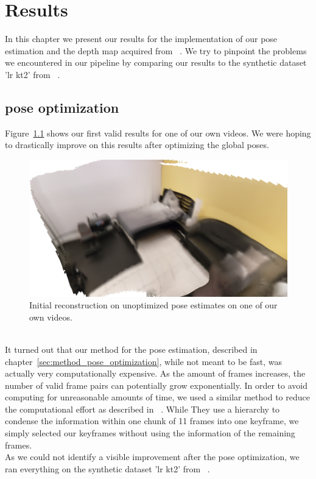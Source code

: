 \chapter{Results}
    In this chapter we present our results for the implementation of our pose estimation and the depth map acquired from ~\cite{luo2020consistent}.
    We try to pinpoint the problems we encountered in our pipeline by comparing our results to the synthetic dataset 'lr kt2' from ~\cite{handa:etal:ICRA2014}.
    \section{pose optimization}
        Figure~\ref{fig:initial_reconstruction} shows our first valid results for one of our own videos.
        We were hoping to drastically improve on this results after optimizing the global poses.
        \begin{figure}[ht]
            \centering
            \includegraphics[width=.6\textwidth]{images/initial_reconstruction.png}
            \caption{Initial reconstruction on unoptimized pose estimates on one of our own videos.}
            \label{fig:initial_reconstruction}
        \end{figure}\\
        It turned out that our method for the pose estimation, described in chapter~\ref{sec:method_pose_optimization}, while not meant to be fast, was actually very computationally expensive.
        As the amount of frames increases, the number of valid frame pairs can potentially grow exponentially.
        In order to avoid computing for unreasonable amounts of time, we used a similar method to reduce the computational effort as described in ~\cite{dai2017bundlefusion}.
        While They use a hierarchy to condense the information within one chunk of 11 frames into one keyframe, we simply selected our keyframes without using the information of the remaining frames.\\
        As we could not identify a visible improvement after the pose optimization, we ran everything on the synthetic dataset 'lr kt2' from ~\cite{handa:etal:ICRA2014}.
